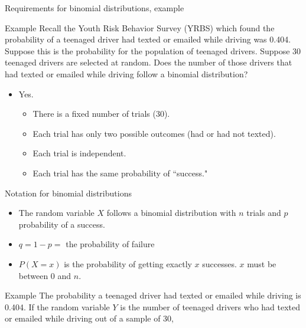 \documentclass[xcolor=table, aspectratio=169, bigger, handout]{beamer}
\begin{document}
\begin{frame}{Requirements for binomial distributions, example}
\begin{exampleblock}{Example}
Recall the Youth Risk Behavior Survey (YRBS) which found the probability of a teenaged driver had texted or emailed while driving was 0.404. Suppose this is the probability for the population of teenaged drivers. Suppose 30 teenaged drivers are selected at random. Does the number of those drivers that had texted or emailed while driving follow a binomial distribution?
\begin{itemize}
\pause\item Yes. 
\begin{itemize}
\item There is a fixed number of trials (30).
\item Each trial has only two possible outcomes (had or had not texted).
\item Each trial is independent.
\item Each trial has the same probability of ``success."
\end{itemize}
\end{itemize}
\end{exampleblock}

\end{frame}


\begin{frame}{Notation for binomial distributions}
\begin{block}{}
\begin{itemize}
\pause\item The random variable $X$ follows a binomial distribution with $n$ trials and $p$ probability of a success.
\pause\item $q = 1- p =$ the probability of failure
\pause\item $P(X=x)$ is the probability of getting exactly $x$ successes. $x$ must be between 0 and $n$.
\end{itemize}
\end{block}
\pause
\begin{exampleblock}{Example}
The probability a teenaged driver had texted or emailed while driving is 0.404. If the random variable $Y$ is the number of teenaged drivers who had texted or emailed while driving out of a sample of 30,\\ \smallskip
{}
\end{exampleblock}
\end{frame}
\end{document}
